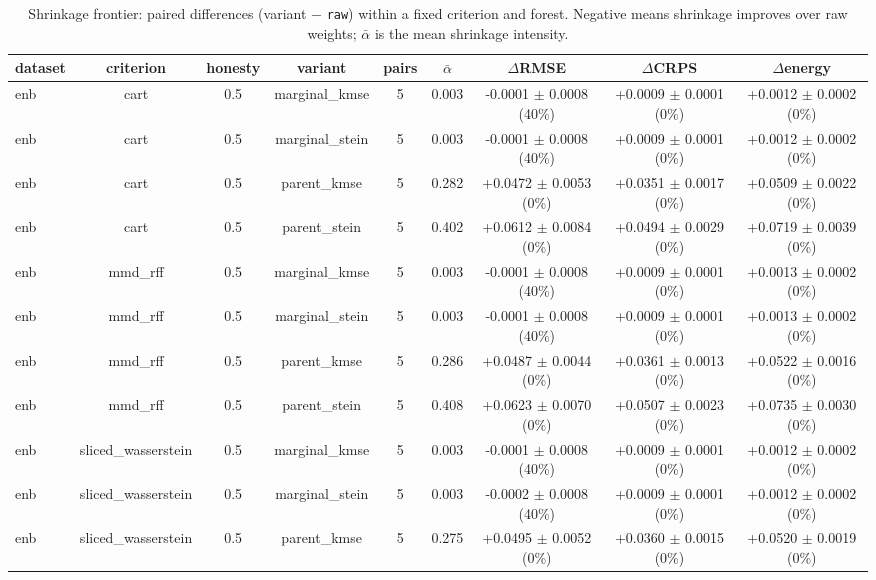 \begin{table}[h]
  \centering
  \caption{Shrinkage frontier: paired differences (variant $-$ \texttt{raw}) within a fixed criterion and forest. Negative means shrinkage improves over raw weights; $\bar\alpha$ is the mean shrinkage intensity.}
  \label{tab:shrinkage}
  \begin{adjustbox}{max width=\textwidth}
  \begin{tabular}{lcccccccc}
    \toprule
    dataset & criterion & honesty & variant & pairs & $\bar\alpha$ & $\Delta$RMSE & $\Delta$CRPS & $\Delta$energy \\
    \midrule
    enb & cart & 0.5 & marginal\_kmse & 5 & 0.003 & -0.0001 $\pm$ 0.0008 (40\%) & +0.0009 $\pm$ 0.0001 (0\%) & +0.0012 $\pm$ 0.0002 (0\%) \\
    enb & cart & 0.5 & marginal\_stein & 5 & 0.003 & -0.0001 $\pm$ 0.0008 (40\%) & +0.0009 $\pm$ 0.0001 (0\%) & +0.0012 $\pm$ 0.0002 (0\%) \\
    enb & cart & 0.5 & parent\_kmse & 5 & 0.282 & +0.0472 $\pm$ 0.0053 (0\%) & +0.0351 $\pm$ 0.0017 (0\%) & +0.0509 $\pm$ 0.0022 (0\%) \\
    enb & cart & 0.5 & parent\_stein & 5 & 0.402 & +0.0612 $\pm$ 0.0084 (0\%) & +0.0494 $\pm$ 0.0029 (0\%) & +0.0719 $\pm$ 0.0039 (0\%) \\
    enb & mmd\_rff & 0.5 & marginal\_kmse & 5 & 0.003 & -0.0001 $\pm$ 0.0008 (40\%) & +0.0009 $\pm$ 0.0001 (0\%) & +0.0013 $\pm$ 0.0002 (0\%) \\
    enb & mmd\_rff & 0.5 & marginal\_stein & 5 & 0.003 & -0.0001 $\pm$ 0.0008 (40\%) & +0.0009 $\pm$ 0.0001 (0\%) & +0.0013 $\pm$ 0.0002 (0\%) \\
    enb & mmd\_rff & 0.5 & parent\_kmse & 5 & 0.286 & +0.0487 $\pm$ 0.0044 (0\%) & +0.0361 $\pm$ 0.0013 (0\%) & +0.0522 $\pm$ 0.0016 (0\%) \\
    enb & mmd\_rff & 0.5 & parent\_stein & 5 & 0.408 & +0.0623 $\pm$ 0.0070 (0\%) & +0.0507 $\pm$ 0.0023 (0\%) & +0.0735 $\pm$ 0.0030 (0\%) \\
    enb & sliced\_wasserstein & 0.5 & marginal\_kmse & 5 & 0.003 & -0.0001 $\pm$ 0.0008 (40\%) & +0.0009 $\pm$ 0.0001 (0\%) & +0.0012 $\pm$ 0.0002 (0\%) \\
    enb & sliced\_wasserstein & 0.5 & marginal\_stein & 5 & 0.003 & -0.0002 $\pm$ 0.0008 (40\%) & +0.0009 $\pm$ 0.0001 (0\%) & +0.0012 $\pm$ 0.0002 (0\%) \\
    enb & sliced\_wasserstein & 0.5 & parent\_kmse & 5 & 0.275 & +0.0495 $\pm$ 0.0052 (0\%) & +0.0360 $\pm$ 0.0015 (0\%) & +0.0520 $\pm$ 0.0019 (0\%) \\

\end{tabular}
\end{adjustbox}
\end{table}
